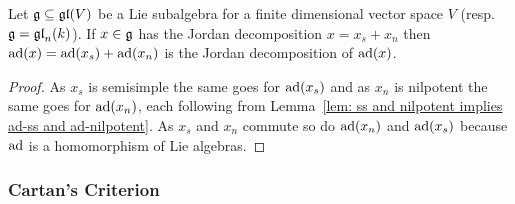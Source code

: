 \begin{cor}\label{cor: concrete Jordan decomposition compatible with adjoint representation}
 Let $\mathfrak{g} \subseteq \mathfrak{gl}(V)$ be a Lie subalgebra for a finite dimensional vector space $V$ (resp.\ $\mathfrak{g} = \mathfrak{gl}_n(k)$). If $x \in \mathfrak{g}$ has the Jordan decomposition $x = x_s + x_n$ then $\operatorname{ad}(x) = \operatorname{ad}(x_s) + \operatorname{ad}(x_n)$ is the Jordan decomposition of $\operatorname{ad}(x)$.
\end{cor}
\begin{proof}
 As $x_s$ is semisimple the same goes for $\operatorname{ad}(x_s)$ and as $x_n$ is nilpotent the same goes for $\operatorname{ad}(x_n)$, each following from Lemma~\ref{lem: ss and nilpotent implies ad-ss and ad-nilpotent}. As $x_s$ and $x_n$ commute so do $\operatorname{ad}(x_n)$ and $\operatorname{ad}(x_s)$ because $\operatorname{ad}$ is a homomorphism of Lie algebras.
\end{proof}














\subsubsection{Cartan’s Criterion}


